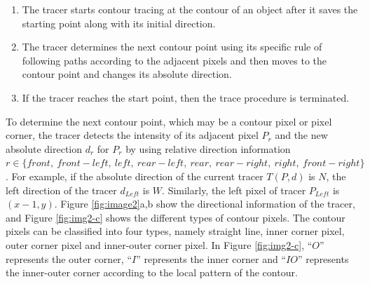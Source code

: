 \documentclass[sensors,article,accept,moreauthors,pdftex,10pt,a4paper]{mdpi}
\begin{document}
\begin{enumerate}[leftmargin=*,labelsep=5mm]
\item The tracer starts contour tracing at the contour of an object after it saves the starting point along with its initial direction. 
\item The tracer determines the next contour point using its specific rule of following paths according to the adjacent pixels and then moves to the contour point and changes its absolute direction.
\item If the tracer reaches the start point, then the trace procedure is terminated. 
\end{enumerate}



To determine the next contour point, which may be a contour pixel or pixel corner, the tracer detects the intensity of its adjacent pixel $P_r$ and the new absolute direction $d_r$ for $P_r$ by using relative direction information $r\in\{front,\ front-left,\ left,\ rear-left,\ rear,\ rear-right,\ right,\ front-right\}$. For example, if the absolute direction of the current tracer $T(P, d)$ is $N$, the left direction of the tracer $d_{Left}$ is $W$. Similarly, the left pixel of tracer $P_{Left}$ is $(x - 1, y)$. Figure \ref{fig:image2}a,b show the directional information of the tracer, and Figure \ref{fig:img2-c} shows the different types of contour pixels. The contour pixels can be classified into four types, namely straight line, inner corner pixel, outer corner pixel and inner-outer corner pixel. In Figure \ref{fig:img2-c}, ``$O$'' represents the outer corner, ``$I$'' represents the inner corner and ``$IO$'' represents the inner-outer corner according to the local pattern of the contour.
\end{document}
